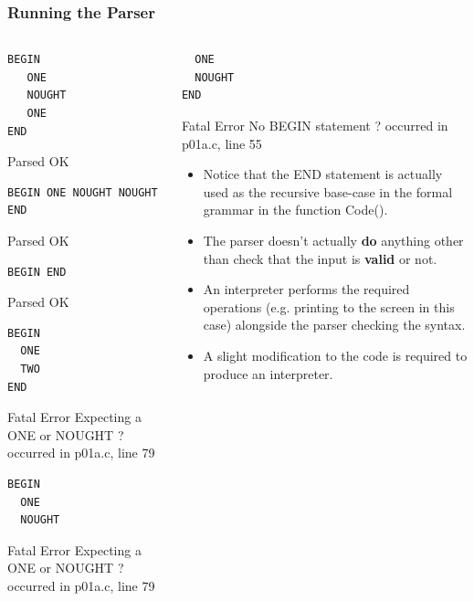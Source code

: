 \begin{frame}[fragile]
\frametitle{Running the Parser}
\begin{columns}[T]

\begin{column}{0.45\textwidth}
{\tiny

\pause
{\bf
\begin{verbatim}
BEGIN
   ONE
   NOUGHT
   ONE
END
\end{verbatim}
}
\vspace*{-1.5ex}
Parsed OK

\pause
{\bf \begin{verbatim}
BEGIN ONE NOUGHT NOUGHT END
\end{verbatim} }
\vspace*{-1.5ex}
Parsed OK

\pause
{\bf \begin{verbatim}
BEGIN END
\end{verbatim} }
\vspace*{-1.5ex}
Parsed OK

\pause
{\bf \begin{verbatim}
BEGIN
  ONE
  TWO
END
\end{verbatim} }
\vspace*{-1.5ex}
Fatal Error Expecting a ONE or NOUGHT ?
occurred in p01a.c, line 79

\pause
{\bf \begin{verbatim}
BEGIN
  ONE
  NOUGHT
\end{verbatim} }
\vspace*{-1.5ex}
Fatal Error Expecting a ONE or NOUGHT ?
occurred in p01a.c, line 79

}
\end{column}


\pause
\begin{column}{0.45\textwidth}
{\tiny
{\bf \begin{verbatim}
  ONE
  NOUGHT
END
\end{verbatim} }
\vspace*{-1.5ex}
Fatal Error No BEGIN statement ?
occurred in p01a.c, line 55
}
\begin{itemize}[<+->]
\item Notice that the END statement is actually used as the recursive base-case in the formal grammar in the function Code().
\item The parser doesn't actually {\bf do} anything other than check that the input is {\bf valid} or not.
\item An interpreter performs the required operations (e.g. printing to the screen in this case) alongside the parser checking the syntax.
\item A slight modification to the code is required to produce an interpreter.
\end{itemize}
\end{column}

\end{columns}
\end{frame}

